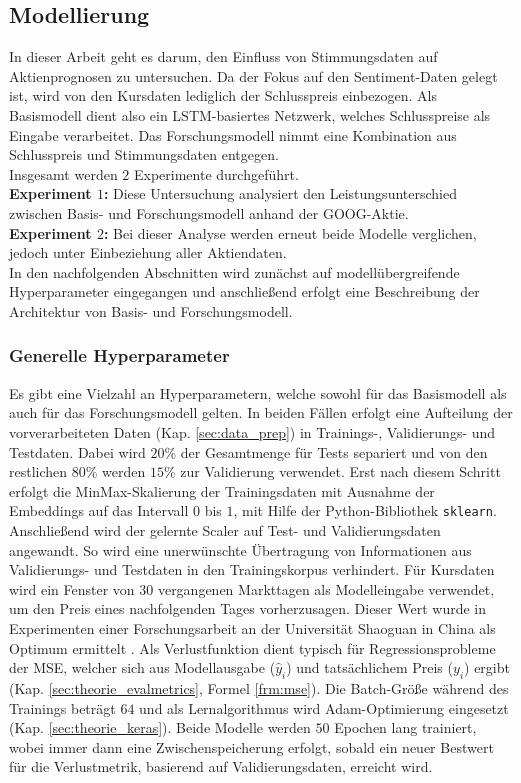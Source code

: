 \newpage
\subsection{Modellierung}\label{sec:modellierung}

In dieser Arbeit geht es darum, den Einfluss von Stimmungsdaten auf Aktienprognosen zu untersuchen. Da der Fokus auf den Sentiment-Daten gelegt ist, wird von den Kursdaten lediglich der Schlusspreis einbezogen. Als Basismodell dient also ein LSTM-basiertes Netzwerk, welches Schlusspreise als Eingabe verarbeitet. Das Forschungsmodell nimmt eine Kombination aus Schlusspreis und Stimmungsdaten entgegen. \\
Insgesamt werden $2$ Experimente durchgeführt. \\
\textbf{Experiment $1$:}    
Diese Untersuchung analysiert den Leistungsunterschied zwischen Basis- und Forschungsmodell anhand der GOOG-Aktie. \\
\textbf{Experiment $2$:}   
Bei dieser Analyse werden erneut beide Modelle verglichen, jedoch unter Einbeziehung aller Aktiendaten. \\
In den nachfolgenden Abschnitten wird zunächst auf modellübergreifende Hyperparameter eingegangen und anschließend erfolgt eine Beschreibung der Architektur von Basis- und Forschungsmodell.

\subsubsection{Generelle Hyperparameter}\label{sec:modellierung_generell_hp}

Es gibt eine Vielzahl an Hyperparametern, welche sowohl für das Basismodell als auch für das Forschungsmodell gelten. 
In beiden Fällen erfolgt eine Aufteilung der vorverarbeiteten Daten (Kap. \ref{sec:data_prep}) in Trainings-, Validierungs- und Testdaten. Dabei wird $20\%$ der Gesamtmenge für Tests separiert und von den restlichen $80\%$ werden $15\%$ zur Validierung verwendet.
Erst nach diesem Schritt erfolgt die MinMax-Skalierung der Trainingsdaten mit Ausnahme der Embeddings auf das Intervall $0$ bis $1$, mit Hilfe der Python-Bibliothek \texttt{sklearn}. Anschließend wird der gelernte Scaler auf Test- und Validierungsdaten angewandt. So wird eine unerwünschte Übertragung von Informationen aus Validierungs- und Testdaten in den Trainingskorpus verhindert. 
Für Kursdaten wird ein Fenster von $30$ vergangenen Markttagen als Modelleingabe verwendet, um den Preis eines nachfolgenden Tages vorherzusagen. Dieser Wert wurde in Experimenten einer Forschungsarbeit an der Universität Shaoguan in China als Optimum ermittelt \autocite[Tabelle 3]{xie2024deep}.
Als Verlustfunktion dient typisch für Regressionsprobleme der \ac{MSE}, welcher sich aus Modellausgabe ($\hat{y}_i$) und tatsächlichem Preis ($y_i$) ergibt (Kap. \ref{sec:theorie_evalmetrics}, Formel \ref{frm:mse}). 
Die Batch-Größe während des Trainings beträgt $64$ und als Lernalgorithmus wird Adam-Optimierung eingesetzt (Kap. \ref{sec:theorie_keras}). 
Beide Modelle werden $50$ Epochen lang trainiert, wobei immer dann eine Zwischenspeicherung erfolgt, sobald ein neuer Bestwert für die Verlustmetrik, basierend auf Validierungsdaten, erreicht wird.


